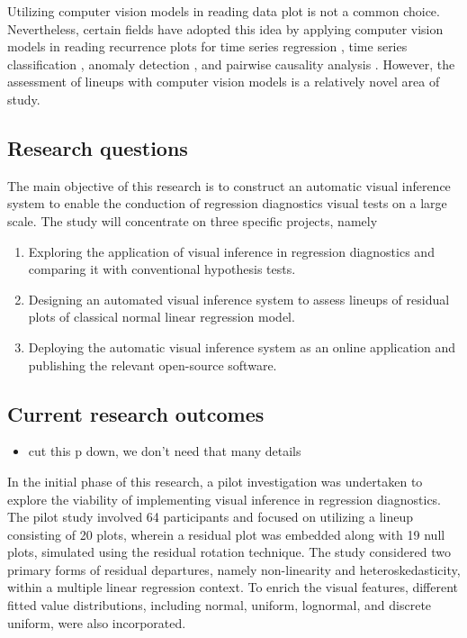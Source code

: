 \documentclass[11pt,a4paper,]{article}
\providecommand{\tightlist}{%
  \setlength{\itemsep}{0pt}\setlength{\parskip}{0pt}}
\begin{document}
Utilizing computer vision models in reading data plot is not a common choice. Nevertheless, certain fields have adopted this idea by applying computer vision models in reading recurrence plots for time series regression \autocite{ojeda_multivariate_2020}, time series classification \autocite{chu_automatic_2019,hailesilassie_financial_2019,hatami_classification_2018,zhang_encoding_2020}, anomaly detection \autocite{chen_convolutional_2020}, and pairwise causality analysis \autocite{singh_deep_2017}. However, the assessment of lineups with computer vision models is a relatively novel area of study.

\hypertarget{research-questions}{%
\subsection{Research questions}\label{research-questions}}

The main objective of this research is to construct an automatic visual inference system to enable the conduction of regression diagnostics visual tests on a large scale. The study will concentrate on three specific projects, namely

\begin{enumerate}
\def\labelenumi{\arabic{enumi}.}
\tightlist
\item
  Exploring the application of visual inference in regression diagnostics and comparing it with conventional hypothesis tests.
\item
  Designing an automated visual inference system to assess lineups of residual plots of classical normal linear regression model.
\item
  Deploying the automatic visual inference system as an online application and publishing the relevant open-source software.
\end{enumerate}

\hypertarget{current-research-outcomes}{%
\subsection{Current research outcomes}\label{current-research-outcomes}}

\begin{itemize}
\tightlist
\item
  cut this p down, we don't need that many details
\end{itemize}

In the initial phase of this research, a pilot investigation was undertaken to explore the viability of implementing visual inference in regression diagnostics. The pilot study involved 64 participants and focused on utilizing a lineup consisting of 20 plots, wherein a residual plot was embedded along with 19 null plots, simulated using the residual rotation technique. The study considered two primary forms of residual departures, namely non-linearity and heteroskedasticity, within a multiple linear regression context. To enrich the visual features, different fitted value distributions, including normal, uniform, lognormal, and discrete uniform, were also incorporated.
\end{document}
